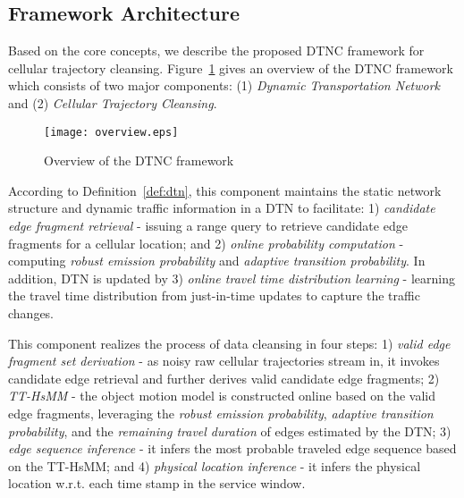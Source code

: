 \documentclass{vldb}
\begin{document}
	\subsection{Framework Architecture}
	
	
	Based on the core concepts, we describe the proposed DTNC framework for cellular trajectory cleansing. Figure~\ref{fig:framework} gives an overview of the DTNC framework which consists of two major components: (1) {\em Dynamic Transportation Network} and (2) {\em Cellular Trajectory Cleansing}.
	
	\begin{figure}[!htb]
		\centering
		\vspace{-10pt}
		\texttt{[image: overview.eps]}
		\caption{Overview of the DTNC framework}
		\label{fig:framework} 
	\end{figure}
	
	According to  Definition~\ref{def:dtn}, this component %
	maintains the static network structure and dynamic traffic information in a DTN to facilitate: 1) {\em candidate edge fragment retrieval}
	- issuing a range query to retrieve candidate edge fragments for a cellular location; 
	and 2) {\em online probability computation} - computing {\em robust emission probability} and {\em adaptive transition probability}. 
	In addition, DTN is updated by 3) 
	{\em online travel time distribution learning} 
	- learning the travel time distribution from just-in-time updates to capture the traffic changes. 
	
	This component realizes the process of data cleansing in four steps: 1) {\em valid edge fragment set derivation} - as noisy raw cellular trajectories stream in, it invokes candidate edge retrieval and further derives valid candidate edge fragments; 
	2) {\em TT-HsMM} - the object motion model is constructed online based on the valid edge fragments, leveraging the {\em robust emission probability}, {\em adaptive transition probability}, and the {\em remaining travel duration} of edges estimated by the DTN;
	3) {\em edge sequence inference} - it infers the most probable traveled edge sequence based on the TT-HsMM; and 4) {\em physical location inference} - it infers the physical location w.r.t. each time stamp in the service window. %
	
\end{document}

